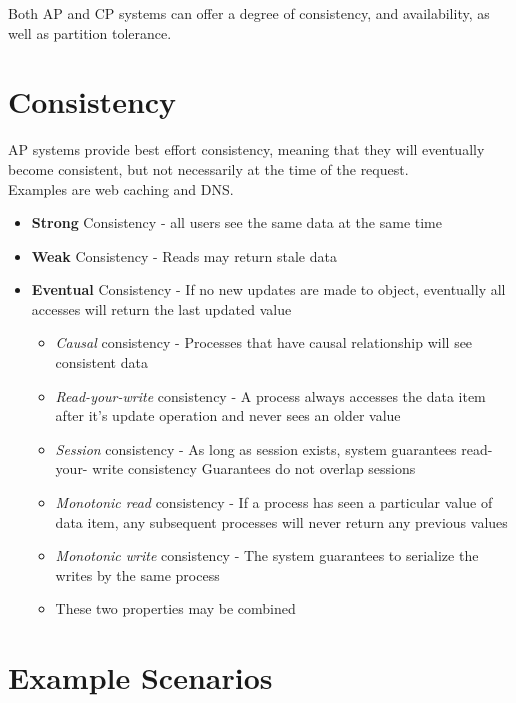 Both AP and CP systems can offer a degree of consistency, and availability, as well as partition tolerance.

\section{Consistency}
AP systems provide best effort consistency, meaning that they will eventually become consistent, but not necessarily at the time of the request.\\
Examples are web caching and DNS.

\begin{itemize}
	\item \textbf{Strong} Consistency - all users see the same data at the same time
	\item \textbf{Weak} Consistency - Reads may return stale data
	\item \textbf{Eventual} Consistency - If no new updates are made to object, eventually all accesses will return the last updated value
   \begin{itemize}
   	\item \textit{Causal} consistency - Processes that have causal
   	      relationship will see
   	      consistent data
   	\item \textit{Read-your-write}
   	      consistency - A process always accesses
   	      the data item after it’s update
   	      operation and never sees an
   	      older value
   	\item \textit{Session} consistency - As long as session exists,
   	      system guarantees read-your-
   	      write consistency
   	      Guarantees do not overlap
   	      sessions
   
   	\item \textit{Monotonic read} consistency - If a process has seen a particular value of data item, any subsequent processes will never return any previous values
   
   	\item \textit{Monotonic write} consistency - The system guarantees to serialize the writes by the same process
   	\item[] These two properties may be combined
   \end{itemize}
\end{itemize}


\section{Example Scenarios}
